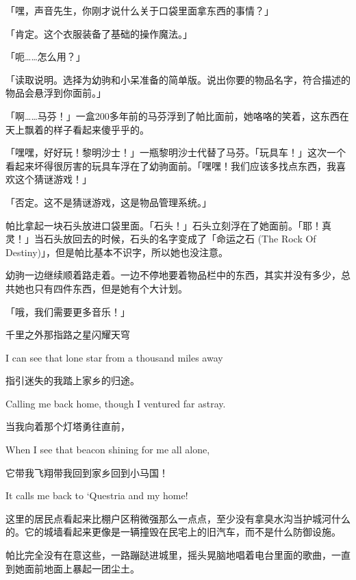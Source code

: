 「嘿，声音先生，你刚才说什么关于口袋里面拿东西的事情？」

「{\mt 肯定。这个衣服装备了基础的操作魔法。}」

「呃……怎么用？」

「{\mt 读取说明。选择为幼驹和小呆准备的简单版。说出你要的物品名字，符合描述的物品会悬浮到你面前。}」

「啊……马芬！」一盒200多年前的马芬浮到了帕比面前，她咯咯的笑着，这东西在天上飘着的样子看起来傻乎乎的。

「嘿嘿，好好玩！黎明沙士！」一瓶黎明沙士代替了马芬。「玩具车！」这次一个看起来坏得很厉害的玩具车浮在了幼驹面前。「嘿嘿！我们应该多找点东西，我喜欢这个猜谜游戏！」

「{\mt 否定。这不是猜谜游戏，这是物品管理系统。}」

帕比拿起一块石头放进口袋里面。「石头！」石头立刻浮在了她面前。「耶！真灵！」当石头放回去的时候，石头的名字变成了「命运之石 (The Rock Of Destiny)」，但是帕比基本不识字，所以她也没注意。

幼驹一边继续顺着路走着。一边不停地要着物品栏中的东西，其实并没有多少，总共她也只有四件东西，但是她有个大计划。

「哦，我们需要更多音乐！」

\begin{song}
千里之外那指路之星闪耀天穹

I can see that lone star from a thousand miles away

\medskip

指引迷失的我踏上家乡的归途。

Calling me back home, though I ventured far astray.

\medskip

当我向着那个灯塔勇往直前，

When I see that beacon shining for me all alone,

\medskip

它带我飞翔带我回到家乡回到小马国！

It calls me back to `Questria and my home!
\end{song}

\horizonline


这里的居民点看起来比棚户区稍微强那么一点点，至少没有拿臭水沟当护城河什么的。它的城墙看起来更像是一辆撞毁在民宅上的旧汽车，而不是什么防御设施。

帕比完全没有在意这些，一路蹦跶进城里，摇头晃脑地唱着电台里面的歌曲，一直到她面前地面上暴起一团尘土。

